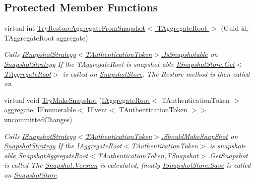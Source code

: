 \subsection*{Protected Member Functions}
\begin{DoxyCompactItemize}
\item 
virtual int \hyperlink{classCqrs_1_1Snapshots_1_1SnapshotRepository_a1328c103474b2b394b7af61a24455a65_a1328c103474b2b394b7af61a24455a65}{Try\+Restore\+Aggregate\+From\+Snapshot$<$ T\+Aggregate\+Root $>$} (Guid id, T\+Aggregate\+Root aggregate)
\begin{DoxyCompactList}\small\item\em Calls \hyperlink{interfaceCqrs_1_1Snapshots_1_1ISnapshotStrategy_a02121821312c4ce2811b31eeaffabe51_a02121821312c4ce2811b31eeaffabe51}{I\+Snapshot\+Strategy$<$\+T\+Authentication\+Token$>$.\+Is\+Snapshotable} on \hyperlink{classCqrs_1_1Snapshots_1_1SnapshotRepository_a7d65b4df10d0b6f75c911a9b6d59b3ba_a7d65b4df10d0b6f75c911a9b6d59b3ba}{Snapshot\+Strategy} If the {\itshape T\+Aggregate\+Root}  is snapshot-\/able \hyperlink{interfaceCqrs_1_1Snapshots_1_1ISnapshotStore_ab7bd163fc9cd5c3bd5911679030be403_ab7bd163fc9cd5c3bd5911679030be403}{I\+Snapshot\+Store.\+Get$<$\+T\+Aggregate\+Root$>$} is called on \hyperlink{classCqrs_1_1Snapshots_1_1SnapshotStore}{Snapshot\+Store}. The Restore method is then called on \end{DoxyCompactList}\item 
virtual void \hyperlink{classCqrs_1_1Snapshots_1_1SnapshotRepository_a82ef7d630bd09e02b573658ab8d909dd_a82ef7d630bd09e02b573658ab8d909dd}{Try\+Make\+Snapshot} (\hyperlink{interfaceCqrs_1_1Domain_1_1IAggregateRoot}{I\+Aggregate\+Root}$<$ T\+Authentication\+Token $>$ aggregate, I\+Enumerable$<$ \hyperlink{interfaceCqrs_1_1Events_1_1IEvent}{I\+Event}$<$ T\+Authentication\+Token $>$$>$ uncommitted\+Changes)
\begin{DoxyCompactList}\small\item\em Calls \hyperlink{interfaceCqrs_1_1Snapshots_1_1ISnapshotStrategy_aeb5fc714ec8a5b60219426f3aabc0f6c_aeb5fc714ec8a5b60219426f3aabc0f6c}{I\+Snapshot\+Strategy$<$\+T\+Authentication\+Token$>$.\+Should\+Make\+Snap\+Shot} on \hyperlink{classCqrs_1_1Snapshots_1_1SnapshotRepository_a7d65b4df10d0b6f75c911a9b6d59b3ba_a7d65b4df10d0b6f75c911a9b6d59b3ba}{Snapshot\+Strategy} If the I\+Aggregate\+Root$<$\+T\+Authentication\+Token$>$ is snapshot-\/able \hyperlink{classCqrs_1_1Snapshots_1_1SnapshotAggregateRoot_a30ec8fe3a09fec8238c5921c629a5ac1_a30ec8fe3a09fec8238c5921c629a5ac1}{Snapshot\+Aggregate\+Root$<$\+T\+Authentication\+Token,\+T\+Snapshot$>$.\+Get\+Snapshot} is called The \hyperlink{classCqrs_1_1Snapshots_1_1Snapshot_a59c0a399430e5f4a1b27d999c3bb5d4f_a59c0a399430e5f4a1b27d999c3bb5d4f}{Snapshot.\+Version} is calculated, finally \hyperlink{interfaceCqrs_1_1Snapshots_1_1ISnapshotStore_a6e99c620115ce8a0648a83bf2ce05527_a6e99c620115ce8a0648a83bf2ce05527}{I\+Snapshot\+Store.\+Save} is called on \hyperlink{classCqrs_1_1Snapshots_1_1SnapshotStore}{Snapshot\+Store}. \end{DoxyCompactList}\end{DoxyCompactItemize}
